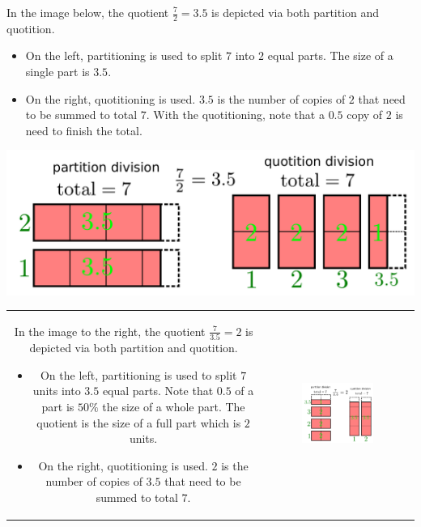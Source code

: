 \documentclass{article}
\begin{document}
\vspace{5mm}


In the image below, the quotient \(\frac{7}{2} = 3.5\) is depicted via both partition and quotition. 
\begin{itemize}
\item On the left, partitioning is used to split \(7\) into \(2\) equal parts. The size of a single part is \(3.5\). 
\item On the right, quotitioning is used. \(3.5\) is the number of copies of \(2\) that need to be summed to total \(7\). With the quotitioning, note that a \(0.5\) copy of \(2\) is need to finish the total. 
\end{itemize}
\includegraphics[width = \textwidth]{7_div_2}

\vspace{5mm}


\begin{tabular}{cc}
\parbox{0.5\textwidth}{
In the image to the right, the quotient \(\frac{7}{3.5} = 2\) is depicted via both partition and quotition. 
\begin{itemize}
\item On the left, partitioning is used to split \(7\) units into \(3.5\) equal parts. Note that \(0.5\) of a part is \(50\%\) the size of a whole part. The quotient is the size of a full part which is \(2\) units. 
\item On the right, quotitioning is used. \(2\) is the number of copies of \(3.5\) that need to be summed to total \(7\). 
\end{itemize}
} & \parbox{0.5\textwidth}{
\includegraphics[width = 0.5\textwidth]{7_div_3p5}
}
\end{tabular}
\end{document}
